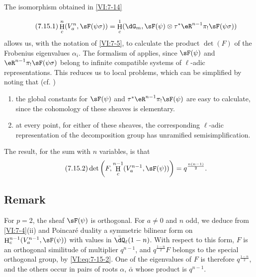 \documentclass[oneside]{book}
\DeclareMathOperator{\h}{H}
\theoremstyle{sga-source}
\theoremstyle{sga-source-dash}
\theoremstyle{sga-source-dotdash}
\theoremstyle{sga-source-number-note-dash}
\theoremstyle{sga-source-note-number-dotdash}
\theoremstyle{sga-source-example-dotdash}
\theoremstyle{sga-source-inline-number}
\theoremstyle{sga-source-bare-number}
\theoremstyle{sga-source}
\newcommand{\PrintPage}[1]{}\newcommand{\MathPage}[1]{}\newcommand{\PrintCite}[2]{#1}\newcommand{\var}[3]{#1}
\begin{document}
The isomorphism obtained in \ref{VI:7-14} 
\PrintPage{226}
\begin{equation*}\tag{7.15.1}\label{VI:eq:7-15-1}
  \h_c^n(V_a^n,\sF(\psi\sigma)) = \h_c^1(\dG_m,\sF(\psi)\otimes \tau^\ast \eR^{n-1} \pi_! \sF(\psi\sigma)) 
\end{equation*}
allows us, with the notation of \ref{VI:7-5}, to calculate the product $\det(F)$ 
of the Frobenius eigenvalues $\alpha_i$. The formalism of \cite{de73} 
applies, since $\sF(\psi)$ and $\eR^{n-1} \pi_! \sF(\psi\sigma)$ 
belong to infinite compatible systems of $\ell$-adic 
representations. This reduces us to local problems, which can be 
simplified by noting that (cf. \cite[9.5]{de73}) 
\begin{enumerate}[\indent a)]
  \item the global constants for 
    $\sF(\psi)$ and $\tau^\ast \eR^{n-1} \pi_! \sF(\psi)$ are easy to calculate, since the cohomology of these sheaves is elementary. 
  \item at every point, for either of these sheaves, the 
    corresponding $\ell$-adic representation of the decomposition group 
    has unramified semisimplification. 
\end{enumerate}

The result, for the sum with $n$ variables, is that 
\begin{equation*}\tag{7.15.2}\label{VI:eq:7-15-2}
  \det\left(F,\h_c^{n-1}(V_a^{n-1},\sF(\psi))\right) = q^{\frac{n(n-1)}{2}} \text{.} 
\end{equation*}





\subsection{Remark}\label{VI:7-16}

For $p=2$, the sheaf $\sF(\psi)$ is orthogonal. For $a\ne 0$ and $n$ 
odd, we deduce from \ref{VI:7-4}(ii) and Poincaré duality a 
symmetric bilinear form on $\h_c^{n-1}(V_a^{n-1},\sF(\psi))$ with 
values in $\bar\dQ_\ell(1-n)$. With respect to this form, $F$ is an 
orthogonal similitude of multiplier $q^{n-1}$, and $q^{\frac{1-n}{2}} F$ 
belongs to the special orthogonal group, by \eqref{VI:eq:7-15-2}. One 
of the \var{eigenvalues of $F$ is therefore $q^{\frac{1-n}{2}}$}{eigenvalues of $F$ is therefore $q^{\frac{n-1}{2}}$}{S45-SOL-0951}, and the others 
occur in pairs of roots $\alpha$, $\bar\alpha$ whose product is $q^{n-1}$. 
\end{document}
